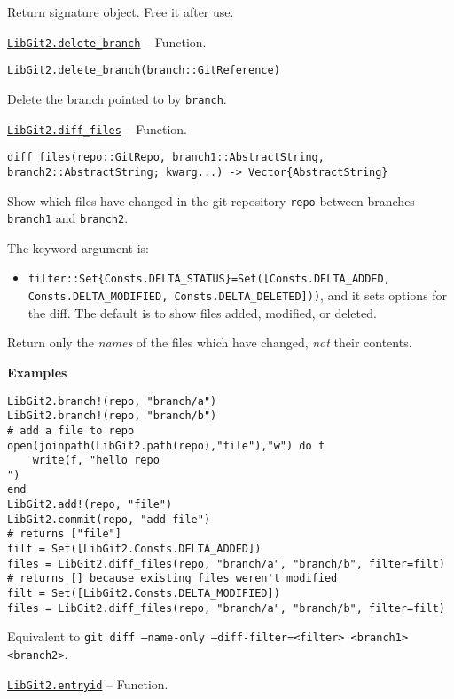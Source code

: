 \begin{adjustwidth}{2em}{0pt}

Return signature object. Free it after use.



\end{adjustwidth}
\hypertarget{3338994964608738996}{} 
\hyperlink{3338994964608738996}{\texttt{LibGit2.delete\_branch}}  -- {Function.}

\begin{adjustwidth}{2em}{0pt}


\begin{verbatim}
LibGit2.delete_branch(branch::GitReference)
\end{verbatim}

Delete the branch pointed to by \texttt{branch}.



\end{adjustwidth}
\hypertarget{15514326201827332376}{} 
\hyperlink{15514326201827332376}{\texttt{LibGit2.diff\_files}}  -- {Function.}

\begin{adjustwidth}{2em}{0pt}


\begin{verbatim}
diff_files(repo::GitRepo, branch1::AbstractString, branch2::AbstractString; kwarg...) -> Vector{AbstractString}
\end{verbatim}

Show which files have changed in the git repository \texttt{repo} between branches \texttt{branch1} and \texttt{branch2}.

The keyword argument is:

\begin{itemize}
\item \texttt{filter::Set\{Consts.DELTA\_STATUS\}=Set([Consts.DELTA\_ADDED, Consts.DELTA\_MODIFIED, Consts.DELTA\_DELETED]))}, and it sets options for the diff. The default is to show files added, modified, or deleted.

\end{itemize}
Return only the \emph{names} of the files which have changed, \emph{not} their contents.

\textbf{Examples}


\begin{verbatim}
LibGit2.branch!(repo, "branch/a")
LibGit2.branch!(repo, "branch/b")
# add a file to repo
open(joinpath(LibGit2.path(repo),"file"),"w") do f
    write(f, "hello repo
")
end
LibGit2.add!(repo, "file")
LibGit2.commit(repo, "add file")
# returns ["file"]
filt = Set([LibGit2.Consts.DELTA_ADDED])
files = LibGit2.diff_files(repo, "branch/a", "branch/b", filter=filt)
# returns [] because existing files weren't modified
filt = Set([LibGit2.Consts.DELTA_MODIFIED])
files = LibGit2.diff_files(repo, "branch/a", "branch/b", filter=filt)
\end{verbatim}

Equivalent to \texttt{git diff --name-only --diff-filter=<filter> <branch1> <branch2>}.



\end{adjustwidth}
\hypertarget{13732663441533972746}{} 
\hyperlink{13732663441533972746}{\texttt{LibGit2.entryid}}  -- {Function.}

